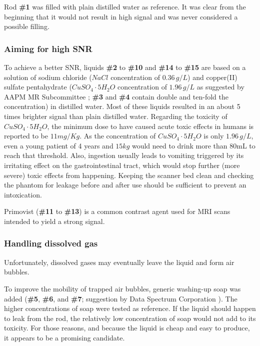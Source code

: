 \vspace{1cm}

Rod \textbf{\#1} was filled with plain distilled water as reference.
It was clear from the beginning that it would not result in high signal and was never considered a possible filling.

\subsubsection{Aiming for high SNR}
To achieve a better SNR, liquids \textbf{\#2} to \textbf{\#10} and \textbf{\#14} to \textbf{\#15} are based on a solution of sodium chloride ($NaCl$ concentration of $0.36 \, g/L$) and copper(II) sulfate pentahydrate ($CuSO_4\cdot5H_2O$ concentration of $1.96 \, g/L$ as suggested by AAPM MR Subcommittee \cite{Jackson2009};  \textbf{\#3} and \textbf{\#4} contain double and ten-fold the concentration) in distilled water.
Most of these liquids resulted in an about 5 times brighter signal than plain distilled water.
Regarding the toxicity of $CuSO_4\cdot5H_2O$, the minimum dose to have caused acute toxic effects in humans is reported to be $11 mg/Kg$.
As the concentration of $CuSO_4\cdot5H_2O$ is only $1.96 \, g/L$, even a young patient of 4 years and $15kg$ would need to drink more than 80mL to reach that threshold.
Also, ingestion usually leads to vomiting triggered by its irritating effect on the gastrointestinal tract, which would stop further (more severe) toxic effects from happening.
Keeping the scanner bed clean and checking the phantom for leakage before and after use should be sufficient to prevent an intoxication.

\vspace{1cm}

Primovist (\textbf{\#11} to \textbf{\#13}) is a common contrast agent used for MRI scans \cite{VanBeers2012, Rohrer, primovist} intended to yield a strong signal.

\subsubsection{Handling dissolved gas}
Unfortunately, dissolved gases may eventually leave the liquid and form air bubbles.

To improve the mobility of trapped air bubbles, generic washing-up soap was added (\textbf{\#5}, \textbf{\#6}, and \textbf{\#7}; suggestion by Data Spectrum Corporation \cite{bubbles}).
The higher concentrations of soap were tested as reference.
If the liquid should happen to leak from the rod, the relatively low concentration of soap would not add to its toxicity.
For those reasons, and because the liquid is cheap and easy to produce, it appears to be a promising candidate.


